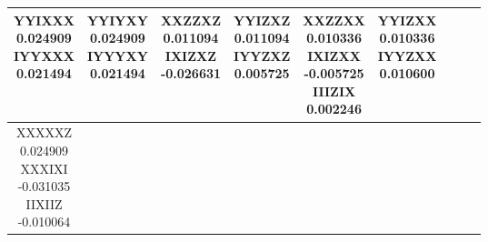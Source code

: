 \documentclass[twocolumn]{revtex4-1}
\newcommand{\1}{\mathbbm{1}}
\begin{document}
\begin{longtable}{|c|c|c|c|c|c|c|c|c|}
{YYIXXX\\
0.024909\\ 
IYYXXX\\
0.021494\\ 
\vspace{.5\baselineskip}}
&
\parbox{1.9cm}{\centering\vspace{.5\baselineskip}
YYIYXY\\
0.024909\\ 
IYYYXY\\
0.021494\\ 
\vspace{.5\baselineskip}}
&
\parbox{1.9cm}{\centering\vspace{.5\baselineskip}
XXZZXZ\\
0.011094\\ 
IXIZXZ\\
-0.026631\\ 
\vspace{.5\baselineskip}}
&
\parbox{1.9cm}{\centering\vspace{.5\baselineskip}
YYIZXZ\\
0.011094\\ 
IYYZXZ\\
0.005725\\ 
\vspace{.5\baselineskip}}
&
\parbox{1.9cm}{\centering\vspace{.5\baselineskip}
XXZZXX\\
0.010336\\ 
IXIZXX\\
-0.005725\\ 
IIIZIX\\
0.002246\\ 
\vspace{.5\baselineskip}}
&
\parbox{1.9cm}{\centering\vspace{.5\baselineskip}
YYIZXX\\
0.010336\\ 
IYYZXX\\
0.010600\\ 
\vspace{.5\baselineskip}}\\									%
\hline
\parbox{1.9cm}{\centering\vspace{.5\baselineskip}
XXXXXZ\\
0.024909\\ 
XXXIXI\\
-0.031035\\ 
IIXIIZ\\
-0.010064\\ 
}
\end{longtable}
\end{document}
